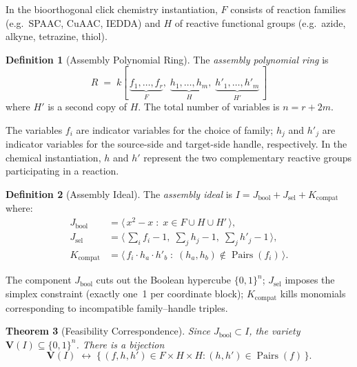 \documentclass[preprint,12pt]{elsarticle}
\newtheorem{theorem}{Theorem}[section]
\theoremstyle{definition}
\newtheorem{definition}[theorem]{Definition}
\theoremstyle{remark}
\newcommand{\kk}{k}
\newcommand{\Var}{\mathbf{V}}
\DeclareMathOperator{\Pairs}{Pairs}
\begin{document}
\noindent
In the bioorthogonal click chemistry instantiation, $F$ consists
of reaction families (e.g.\ SPAAC, CuAAC, IEDDA) and $H$ of
reactive functional groups (e.g.\ azide, alkyne, tetrazine, thiol).

\begin{definition}[Assembly Polynomial Ring]\label{def:ring}
The \emph{assembly polynomial ring} is
\[
  R \;=\; \kk[\,\underbrace{f_1, \ldots, f_r}_{F},\;
              \underbrace{h_1, \ldots, h_m}_{H},\;
              \underbrace{h'_1, \ldots, h'_m}_{H'}\,]
\]
where $H'$ is a second copy of $H$.
The total number of variables is $n = r + 2m$.
\end{definition}

The variables $f_i$ are indicator variables for the choice of
family; $h_j$ and $h'_j$ are indicator variables for the
source-side and target-side handle, respectively.  In the
chemical instantiation, $h$ and $h'$ represent the two
complementary reactive groups participating in a reaction.

\begin{definition}[Assembly Ideal]\label{def:ideal}
The \emph{assembly ideal} is $I = J_{\mathrm{bool}} + J_{\mathrm{sel}} + K_{\mathrm{compat}}$
where:
\begin{align}
  J_{\mathrm{bool}} &= \langle\, x^2 - x \;:\; x \in F \cup H \cup H'\,\rangle,
    \label{eq:jbool} \\
  J_{\mathrm{sel}} &= \bigl\langle\, \textstyle\sum_{i} f_i - 1,\;
    \textstyle\sum_{j} h_j - 1,\;
    \textstyle\sum_{j} h'_j - 1 \,\bigr\rangle,
    \label{eq:jsel} \\
  K_{\mathrm{compat}} &= \langle\, f_i \cdot h_a \cdot h'_b
    \;:\; (h_a, h_b) \notin \Pairs(f_i) \,\rangle.
    \label{eq:kcompat}
\end{align}
\end{definition}

The component $J_{\mathrm{bool}}$ cuts out the Boolean hypercube
$\{0,1\}^n$; $J_{\mathrm{sel}}$ imposes the simplex constraint
(exactly one~1 per coordinate block); $K_{\mathrm{compat}}$ kills
monomials corresponding to incompatible family--handle triples.

\begin{theorem}[Feasibility Correspondence]\label{thm:feasibility}
Since $J_{\mathrm{bool}} \subset I$, the variety
$\Var(I) \subseteq \{0,1\}^n$.  There is a bijection
\[
  \Var(I) \;\longleftrightarrow\;
  \bigl\{\,(f, h, h') \in F \times H \times H :
  (h, h') \in \Pairs(f)\,\bigr\}.
\]
\end{theorem}
\end{document}

